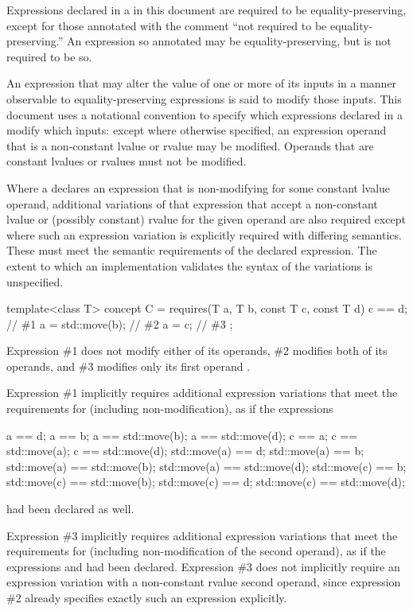 \pnum
Expressions declared in a  in this document are
required to be equality-preserving, except for those annotated with the comment
``not required to be equality-preserving.'' An expression so annotated
may be equality-preserving, but is not required to be so.

\pnum
An expression that may alter the value of one or more of its inputs in a manner
observable to equality-preserving expressions is said to modify those inputs.
This document uses a notational convention to specify which expressions declared
in a  modify which inputs: except where
otherwise specified, an expression operand that is a non-constant lvalue or
rvalue may be modified. Operands that are constant lvalues or rvalues must not
be modified.

\pnum
Where a  declares an expression that is
non-modifying for some constant lvalue operand, additional variations of that
expression that accept a non-constant lvalue or (possibly constant) rvalue for
the given operand are also required except where such an expression variation is
explicitly required with differing semantics. These
 must meet the semantic requirements of the
declared expression. The extent to which an implementation validates the syntax
of the variations is unspecified.

\begin{example}
\begin{codeblock}
template<class T>
concept C =
  requires(T a, T b, const T c, const T d) {
    c == d;           // \#1
    a = std::move(b); // \#2
    a = c;            // \#3
  };
\end{codeblock}

Expression \#1 does not modify either of its operands, \#2 modifies both of its
operands, and \#3 modifies only its first operand .

Expression \#1 implicitly requires additional expression variations that meet
the requirements for  (including non-modification), as if the
expressions
\begin{codeblock}
a == d;                       a == b;                       a == std::move(b); a == std::move(d);
c == a;                       c == std::move(a);            c == std::move(d);
std::move(a) == d;            std::move(a) == b;
std::move(a) == std::move(b); std::move(a) == std::move(d);
std::move(c) == b;            std::move(c) == std::move(b);
std::move(c) == d;            std::move(c) == std::move(d);
\end{codeblock}
had been declared as well.

Expression \#3 implicitly requires additional expression variations that meet
the requirements for  (including non-modification of the second
operand), as if the expressions  and  had
been declared. Expression \#3 does not implicitly require an expression
variation with a non-constant rvalue second operand, since expression \#2
already specifies exactly such an expression explicitly.
\end{example}


